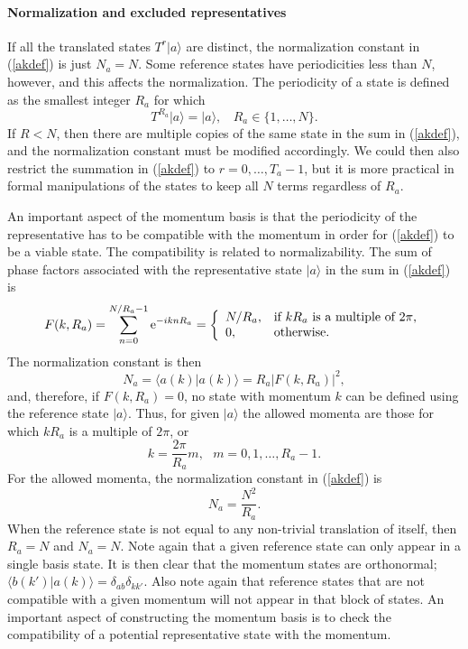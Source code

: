 \documentclass[draft,numberedheadings]{aipproc}
\begin{document}
\paragraph{Normalization and excluded representatives}

If all the translated states $T^r|a\rangle$ are distinct, the normalization constant in (\ref{akdef}) is just $N_a=N$. Some reference states have 
periodicities less than $N$, however, and this affects the normalization. The periodicity of a state is defined as the smallest integer $R_a$ for which
\begin{equation}
T^{R_a}|a\rangle=|a\rangle,~~~~R_a \in \{1,\ldots,N\}.
\end{equation}
If $R < N$, then there are multiple copies of the same state in the sum in (\ref{akdef}), and the normalization constant must be modified 
accordingly. We could then also restrict the summation in (\ref{akdef}) to $r=0,\ldots,T_a-1$, but it is more practical in formal manipulations 
of the states to keep all $N$ terms regardless of $R_a$. 

An important aspect of the momentum basis is that the periodicity of the representative has to be compatible with the momentum in order for 
(\ref{akdef}) to be a viable state. The compatibility is related to normalizability. The sum of phase factors associated with the representative
state $|a\rangle$ in the sum in (\ref{akdef}) is
\begin{equation}
F(k,R_a)= \sum_{n=0}^{N/R_a-1} {\rm e}^{-iknR_a} = \left \lbrace
\begin{array}{ll}
N/R_a, & \hbox{if $kR_a$ is a multiple of $2\pi$,} \\
0, & \hbox{otherwise.}\end{array} \right.
\end{equation}
The normalization constant is then
\begin{equation}
N_a=\langle a(k)|a(k)\rangle = R_a |F(k,R_a)|^2,
\end{equation}
and, therefore, if $F(k,R_a)=0$, no state with momentum $k$ can be defined using the reference state $|a\rangle$. 
Thus, for given $|a\rangle$ the allowed momenta are those for which $kR_a$ is a multiple of $2\pi$, or
\begin{equation}
k = \frac{2\pi}{R_a}m,~~~m=0,1,\ldots,R_a-1.
\label{allowedk}
\end{equation}
For the allowed momenta, the normalization constant in (\ref{akdef}) is
\begin{equation}
N_a=\frac{N^2}{R_a}.
\label{na1}
\end{equation}
When the reference state is not equal to any non-trivial translation of itself, then $R_a=N$ and $N_a=N$. Note again that a given reference state can only appear in a 
single basis state. It is then clear that the momentum states are orthonormal; $\langle b(k')|a(k)\rangle = \delta_{ab}\delta_{kk'}$. Also note again that reference 
states that are not compatible with a given momentum will not appear in that block of states. An important aspect of constructing the momentum basis is to check 
the compatibility of a potential representative state with the momentum.
\end{document}
